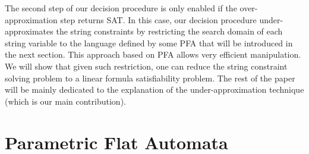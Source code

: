 \documentclass[sigplan,review,anonymous]{acmart}\settopmatter{printfolios=true,printccs=false,printacmref=false}
\begin{document}
The second step of our decision procedure is only enabled if the over-approximation step returns SAT. In this case, our decision procedure  under-approximates the string constraints by restricting the search domain of each string variable to the language defined by some PFA that will be introduced in the next section. This approach based on PFA allows very efficient manipulation. We will show that given such restriction, one can reduce the string constraint solving problem to a linear formula satisfiability problem. The rest of the paper will be mainly dedicated to the explanation of the under-approximation technique (which is our main contribution).




%
\section{Parametric Flat Automata} \label{section:sfa}
\end{document}

